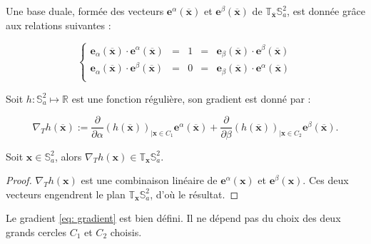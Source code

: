 Une base duale, formée des vecteurs  $\mathbf{e}^{\alpha}(\overline{\mathbf{x}})$ et $\mathbf{e}^{\beta}(\overline{\mathbf{x}})$ de $\mathbb{T}_{\overline{\mathbf{x}}} \mathbb{S}_a^2$, est donnée grâce aux relations suivantes :

\begin{equation}
\left\lbrace
\begin{array}{rcccl}
\mathbf{e}_{\alpha}(\overline{\mathbf{x}}) \cdot \mathbf{e}^{\alpha}(\overline{\mathbf{x}}) & = & 1 & = & \mathbf{e}_{\beta}(\overline{\mathbf{x}}) \cdot \mathbf{e}^{\beta}(\overline{\mathbf{x}}) \\
\mathbf{e}_{\alpha}(\overline{\mathbf{x}}) \cdot \mathbf{e}^{\beta}(\overline{\mathbf{x}}) & = & 0 & = & \mathbf{e}_{\beta}(\overline{\mathbf{x}}) \cdot \mathbf{e}^{\alpha}(\overline{\mathbf{x}}) \\
\end{array}
\right.
\label{eq: dualite alpha beta}
\end{equation}

Soit $h : \mathbb{S}_a^2 \mapsto \mathbb{R}$ est une fonction régulière, son gradient est donné par :

\begin{equation}
\nabla_{T} h(\overline{\mathbf{x}}) := \dfrac{\partial}{\partial \alpha} \left( h(\overline{\mathbf{x}}) \right)_{| \mathbf{x} \in C_1} \mathbf{e}^{\alpha}(\overline{\mathbf{x}}) + \dfrac{\partial}{\partial \beta}\left(  h(\overline{\mathbf{x}}) \right)_{| \mathbf{x} \in C_2} \mathbf{e}^{\beta}(\overline{\mathbf{x}}).
\label{eq: gradient}
\end{equation}

\begin{proposition}
Soit $\mathbf{x} \in \mathbb{S}_a^2$, alors $\nabla_{T} h (\mathbf{x}) \in \mathbb{T}_{\mathbf{x}} \mathbb{S}_a^2$.
\end{proposition}

\begin{proof}
$\nabla_{T} h (\mathbf{x})$ est une combinaison linéaire de $\mathbf{e}^{\alpha}(\mathbf{x})$ et $\mathbf{e}^{\beta}(\mathbf{x})$. Ces deux vecteurs engendrent le plan $\mathbb{T}_{\mathbf{x}}\mathbb{S}_a^2$, d'où le résultat.
\end{proof}

\begin{proposition}
Le gradient \eqref{eq: gradient} est bien défini. Il ne dépend pas du choix des deux grands cercles $C_1$ et $C_2$ choisis.
\end{proposition}


